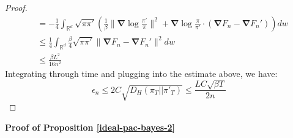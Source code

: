 \documentclass[final,12pt]{colt2018} %
\begin{document}
\begin{proof}
\begin{equation}
\begin{split}
&=-\frac{1}{4}\int_{\mathbb{R}^d}\sqrt{\pi \pi'}\left(\frac{1}{\beta}\|\bm{\nabla}\log\frac{\pi'}{\pi}\|^2+\bm{\nabla}\log\frac{\pi}{\pi'}\cdot(\bm{\nabla}F_n-\bm{\nabla}F_n')\right)dw\\
&\le\frac{1}{4}\int_{\mathbb{R}^d}\frac{\beta}{4}\sqrt{\pi \pi'}\|\bm{\nabla}F_n-\bm{\nabla}F_n'\|^2dw\\
&\le \frac{\beta L^2}{16n^2}
\end{split}
\end{equation}
Integrating through time and plugging into the estimate above, we have:
\begin{equation}
  \epsilon_n\leq 2C \sqrt{D_H(\pi_T||\pi'_T)}\leq \frac{LC\sqrt{\beta T}}{2n}
\end{equation}
\end{proof}

\noindent \textbf{Proof of Proposition \ref{ideal-pac-bayes-2}}
\end{document}
